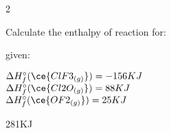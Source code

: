 \documentclass[main.tex]{subfiles}
\begin{document}
\begin{multicols*}{2}
\begin{question}[ID=\the\value{numA}]
Calculate the enthalpy of reaction for:
\begin{center}\end{center}
given:
\begin{center}
$\Delta H^{\circ}_f(\ce{ClF3_{(g)}})=-156KJ$\\
$\Delta H^{\circ}_f(\ce{Cl2O_{(g)}})=88KJ$\\
$\Delta H^{\circ}_f(\ce{OF2_{(g)}})=25KJ$
\end{center}\end{question}
\begin{solution}
281KJ
 \hspace{0.1cm}\end{solution}


\end{multicols*}
\end{document}

